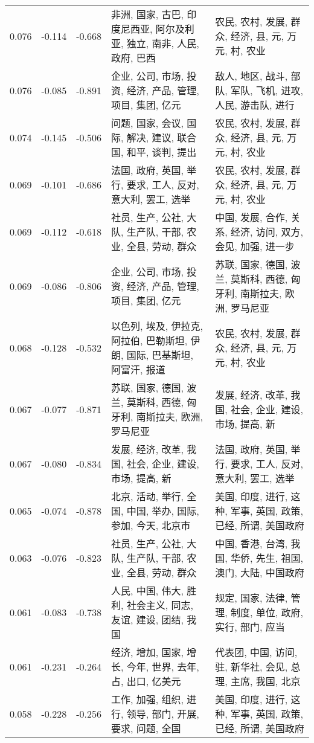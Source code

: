 \begin{tabular}{cccp{5cm}p{5cm}}
0.076 & -0.114 & -0.668 & 非洲, 国家, 古巴, 印度尼西亚, 阿尔及利亚, 独立, 南非, 人民, 政府, 巴西 & 农民, 农村, 发展, 群众, 经济, 县, 元, 万元, 村, 农业 \\
0.076 & -0.085 & -0.891 & 企业, 公司, 市场, 投资, 经济, 产品, 管理, 项目, 集团, 亿元 & 敌人, 地区, 战斗, 部队, 军队, 飞机, 进攻, 人民, 游击队, 进行 \\
0.074 & -0.145 & -0.506 & 问题, 国家, 会议, 国际, 解决, 建议, 联合国, 和平, 谈判, 提出 & 农民, 农村, 发展, 群众, 经济, 县, 元, 万元, 村, 农业 \\
0.069 & -0.101 & -0.686 & 法国, 政府, 英国, 举行, 要求, 工人, 反对, 意大利, 罢工, 选举 & 农民, 农村, 发展, 群众, 经济, 县, 元, 万元, 村, 农业 \\
0.069 & -0.112 & -0.618 & 社员, 生产, 公社, 大队, 生产队, 干部, 农业, 全县, 劳动, 群众 & 中国, 发展, 合作, 关系, 经济, 访问, 双方, 会见, 加强, 进一步 \\
0.069 & -0.086 & -0.806 & 企业, 公司, 市场, 投资, 经济, 产品, 管理, 项目, 集团, 亿元 & 苏联, 国家, 德国, 波兰, 莫斯科, 西德, 匈牙利, 南斯拉夫, 欧洲, 罗马尼亚 \\
0.068 & -0.128 & -0.532 & 以色列, 埃及, 伊拉克, 阿拉伯, 巴勒斯坦, 伊朗, 国际, 巴基斯坦, 阿富汗, 报道 & 农民, 农村, 发展, 群众, 经济, 县, 元, 万元, 村, 农业 \\
0.067 & -0.077 & -0.871 & 苏联, 国家, 德国, 波兰, 莫斯科, 西德, 匈牙利, 南斯拉夫, 欧洲, 罗马尼亚 & 发展, 经济, 改革, 我国, 社会, 企业, 建设, 市场, 提高, 新 \\
0.067 & -0.080 & -0.834 & 发展, 经济, 改革, 我国, 社会, 企业, 建设, 市场, 提高, 新 & 法国, 政府, 英国, 举行, 要求, 工人, 反对, 意大利, 罢工, 选举 \\
0.065 & -0.074 & -0.878 & 北京, 活动, 举行, 全国, 中国, 举办, 国际, 参加, 今天, 北京市 & 美国, 印度, 进行, 这种, 军事, 英国, 政策, 已经, 所谓, 美国政府 \\
0.063 & -0.076 & -0.823 & 社员, 生产, 公社, 大队, 生产队, 干部, 农业, 全县, 劳动, 群众 & 中国, 香港, 台湾, 我国, 华侨, 先生, 祖国, 澳门, 大陆, 中国政府 \\
0.061 & -0.083 & -0.738 & 人民, 中国, 伟大, 胜利, 社会主义, 同志, 友谊, 建设, 团结, 我国 & 规定, 国家, 法律, 管理, 制度, 单位, 政府, 实行, 部门, 应当 \\
0.061 & -0.231 & -0.264 & 经济, 增加, 国家, 增长, 今年, 世界, 去年, 占, 出口, 亿美元 & 代表团, 中国, 访问, 驻, 新华社, 会见, 总理, 主席, 我国, 北京 \\
0.058 & -0.228 & -0.256 & 工作, 加强, 组织, 进行, 领导, 部门, 开展, 要求, 问题, 全国 & 美国, 印度, 进行, 这种, 军事, 英国, 政策, 已经, 所谓, 美国政府 \\

\end{tabular}
